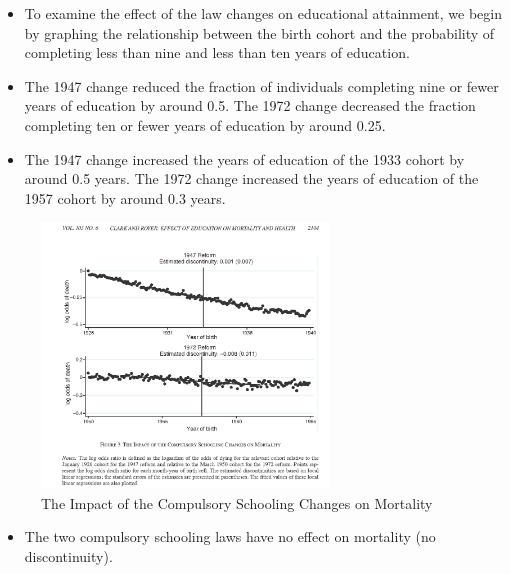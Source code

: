 \begin{itemize}
        \item To examine the effect of the law changes on educational attainment, we begin by graphing the relationship between the birth cohort and the probability of completing less than nine and less than ten years of education.
        \item The 1947 change reduced the fraction of individuals completing nine or fewer years of education by around 0.5. The 1972 change decreased the fraction completing ten or fewer years of education by around 0.25.
        \item The 1947 change increased the years of education of the 1933 cohort by around 0.5 years. The 1972 change increased the years of education of the 1957 cohort by around 0.3 years.
\end{itemize}


\begin{figure}[H]%
                \centering
                \includegraphics[width=3in]{images/ch3/37.png}
                \caption{The Impact of the Compulsory Schooling Changes on Mortality}
                \label{fig:label}
            \end{figure}

\begin{itemize}
        \item The two compulsory schooling laws have no effect on mortality (no discontinuity).
\end{itemize}        

